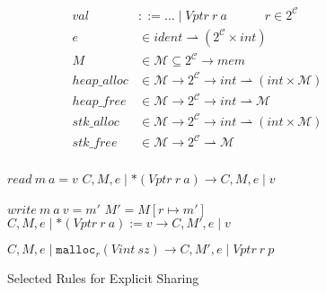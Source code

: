 \documentclass{article}
\begin{document}

\begin{figure}

  \begin{minipage}{0.45\textwidth}
    \[\begin{aligned}
    \mathit{val} & ::= \ldots \mid \mathit{Vptr} ~ r ~ a \hspace{3em} r \in 2^{\mathcal{C}} \\
    e & \in \mathit{ident} \rightharpoonup (2^{\mathcal{C}} \times \mathit{int}) \\
    M & \in \mathcal{M} \subseteq 2^{\mathcal{C}} \rightarrow \mathit{mem} \\
    \mathit{heap\_alloc} & \in \mathcal{M} \rightarrow 2^{\mathcal{C}} \rightarrow
    \mathit{int} \rightharpoonup (\mathit{int} \times \mathcal{M}) \\
    \mathit{heap\_free} & \in \mathcal{M} \rightarrow 2^{\mathcal{C}} \rightarrow
    \mathit{int} \rightharpoonup \mathcal{M} \\
    \mathit{stk\_alloc} & \in \mathcal{M} \rightarrow 2^{\mathcal{C}} \rightarrow
    \mathit{int} \rightharpoonup (\mathit{int} \times \mathcal{M}) \\
    \mathit{stk\_free} & \in \mathcal{M} \rightarrow 2^{\mathcal{C}}
    \rightharpoonup \mathcal{M} \\
    \end{aligned}\]
  \end{minipage}
  \begin{minipage}{0.55\textwidth}
                {\(\mathit{read} ~ m ~ a = v\)}
                {\(C,M,e \mid *(\mathit{Vptr} ~ r ~ a)
                  \longrightarrow C,M,e \mid v\)}

                  {\(\mathit{write} ~ m ~ a ~ v = m'\)}
                  {\(M' = M[r \mapsto m']\)}
                  {\(C,M,e \mid *(\mathit{Vptr} ~ r ~ a) := v
                    \longrightarrow C,M',e \mid v\)}

             {\(C,M,e \mid \mathtt{malloc}_r(\mathit{Vint} ~ sz)
               \longrightarrow C,M',e \mid \mathit{Vptr} ~ r ~ p\)}

  \end{minipage}

  \caption{Selected Rules for Explicit Sharing}
  \label{fig:powerset}
\end{figure}

  
  
\end{document}
